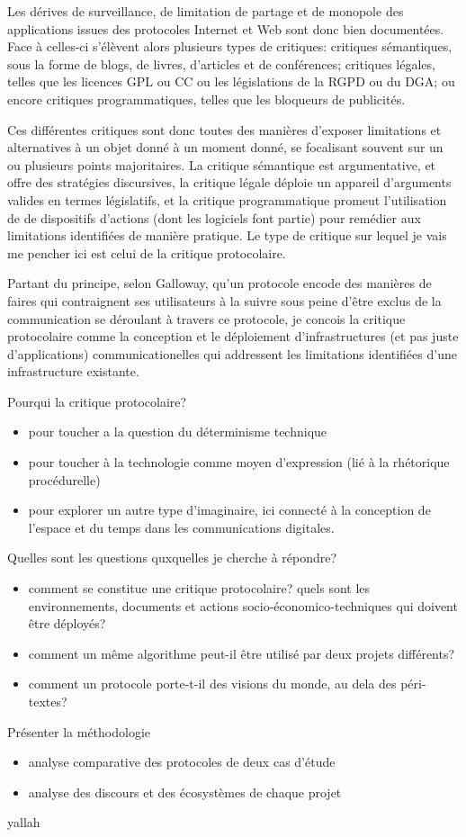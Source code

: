 \documentclass{article}
\begin{document}
Les dérives de surveillance, de limitation de partage et de monopole des applications issues des protocoles Internet et Web sont donc bien documentées. Face à celles-ci s'élèvent alors plusieurs types de critiques: critiques sémantiques, sous la forme de blogs, de livres, d'articles et de conférences; critiques légales, telles que les licences GPL ou CC ou les législations de la RGPD ou du DGA; ou encore critiques programmatiques, telles que les bloqueurs de publicités.

Ces différentes critiques sont donc toutes des manières d'exposer limitations et alternatives à un objet donné à un moment donné, se focalisant souvent sur un ou plusieurs points majoritaires. La critique sémantique est argumentative, et offre des stratégies discursives, la critique légale déploie un appareil d'arguments valides en termes législatifs, et la critique programmatique promeut l'utilisation de de dispositifs d'actions (dont les logiciels font partie) pour remédier aux limitations identifiées de manière pratique. Le type de critique sur lequel je vais me pencher ici est celui de la critique protocolaire.

Partant du principe, selon Galloway, qu'un protocole encode des manières de faires qui contraignent ses utilisateurs à la suivre sous peine d'être exclus de la communication se déroulant à travers ce protocole\cite{galloway_protocol_2004}, je concois la critique protocolaire comme la conception et le déploiement d'infrastructures (et pas juste d'applications) communicationelles qui addressent les limitations identifiées d'une infrastructure existante.

Pourqui la critique protocolaire?

\begin{itemize}
    \item pour toucher a la question du déterminisme technique
    \item pour toucher à la technologie comme moyen d'expression (lié à la rhétorique procédurelle)
    \item pour explorer un autre type d'imaginaire, ici connecté à la conception de l'espace et du temps dans les communications digitales.
\end{itemize}

Quelles sont les questions quxquelles je cherche à répondre?

\begin{itemize}
    \item comment se constitue une critique protocolaire? quels sont les environnements, documents et actions socio-économico-techniques qui doivent être déployés?
    \item comment un même algorithme peut-il être utilisé par deux projets différents?
    \item comment un protocole porte-t-il des visions du monde, au dela des péri-textes?
\end{itemize}

Présenter la méthodologie

\begin{itemize}
    \item analyse comparative des protocoles de deux cas d'étude
    \item analyse des discours et des écosystèmes de chaque projet
\end{itemize}

yallah

\pagebreak



\end{document}
